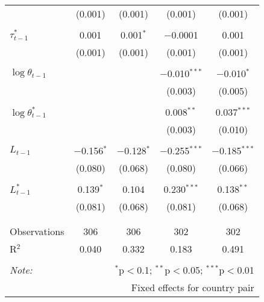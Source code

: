 \begin{tabular}{@{\extracolsep{5pt}}lcccc}
  & (0.001) & (0.001) & (0.001) & (0.001) \\ 
  & & & & \\ 
 $\tau_{t-1}^*$ & 0.001 & 0.001$^{*}$ & $-$0.0001 & 0.001 \\ 
  & (0.001) & (0.001) & (0.001) & (0.001) \\ 
  & & & & \\ 
 $\log \theta_{t-1}$ &  &  & $-$0.010$^{***}$ & $-$0.010$^{*}$ \\ 
  &  &  & (0.003) & (0.005) \\ 
  & & & & \\ 
 $\log \theta_{t-1}^*$ &  &  & 0.008$^{**}$ & 0.037$^{***}$ \\ 
  &  &  & (0.003) & (0.010) \\ 
  & & & & \\ 
 $L_{t-1}$ & $-$0.156$^{*}$ & $-$0.128$^{*}$ & $-$0.255$^{***}$ & $-$0.185$^{***}$ \\ 
  & (0.080) & (0.068) & (0.080) & (0.066) \\ 
  & & & & \\ 
 $L_{t-1}^*$ & 0.139$^{*}$ & 0.104 & 0.230$^{***}$ & 0.138$^{**}$ \\ 
  & (0.081) & (0.068) & (0.081) & (0.068) \\ 
  & & & & \\ 
\hline \\[-1.8ex] 
Observations & 306 & 306 & 302 & 302 \\ 
R$^{2}$ & 0.040 & 0.332 & 0.183 & 0.491 \\ 
\hline 
\hline \\[-1.8ex] 
\textit{Note:}  & \multicolumn{4}{r}{$^{*}$p$<$0.1; $^{**}$p$<$0.05; $^{***}$p$<$0.01} \\ 
 & \multicolumn{4}{r}{Fixed effects for country pair} \\ 
\end{tabular} 
